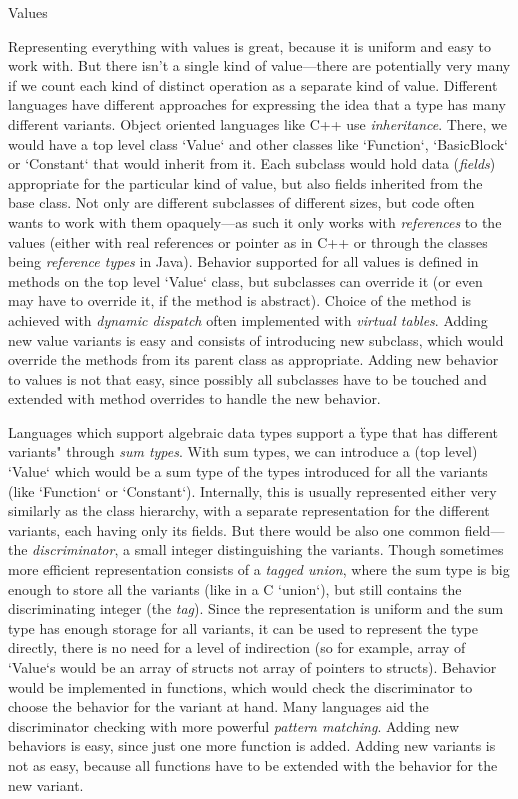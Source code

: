 \seccc Values

Representing everything with values is great, because it is uniform and
easy to work with. But there isn't a single kind of value---there are
potentially very many if we count each kind of distinct operation as a separate
kind of value. Different languages have different approaches for expressing the
idea that a type has many different variants. Object oriented
languages like C++ use {\em inheritance}. There, we would have a top level class
`Value` and other classes like `Function`, `BasicBlock` or `Constant` that would
inherit from it. Each subclass would hold data ({\em fields}) appropriate for
the particular
kind of value, but also fields inherited from the base class. Not only are
different subclasses of different sizes, but code often wants to work with them
opaquely---as such it only works with {\em references} to the values (either
with real references or pointer as in C++ or through the classes being {\em
reference types} in Java). Behavior supported for all values is defined in
methods on the top level `Value` class, but subclasses can override it (or even
may have to override it, if the method is abstract). Choice of the method
is achieved with {\em dynamic dispatch} often implemented
with {\em virtual tables}. Adding new value variants is easy and consists of
introducing new subclass, which would override the methods from its parent class
as appropriate. Adding new behavior to values is not that easy, since possibly
all subclasses have to be touched and extended with method overrides to handle
the new behavior.

Languages which support algebraic data types support a \"type that has different
variants" through {\em sum types}. With sum types, we can introduce a (top
level) `Value` which would be a sum type of the types introduced for all the
variants (like `Function` or `Constant`). Internally, this is usually
represented either very similarly as the class hierarchy, with a separate
representation for the different variants, each having only its fields. But there
would be also one common field---the {\em discriminator}, a small integer
distinguishing the variants. Though sometimes more efficient representation
consists of a {\em tagged union}, where the sum type is big enough to store all the
variants (like in a C `union`), but still contains the discriminating integer
(the {\em tag}). Since the representation is uniform and the sum type has enough
storage for all variants, it can be used to represent the type directly, there
is no need for a level of indirection (so for example, array of `Value`s would be an
array of structs not array of pointers to structs). Behavior would be
implemented in functions, which would check the discriminator to choose the
behavior for the variant at hand. Many languages aid the discriminator checking
with more powerful {\em pattern matching}. Adding new behaviors is easy, since just
one more function is added. Adding new variants is not as easy, because all
functions have to be extended with the behavior for the new variant.

